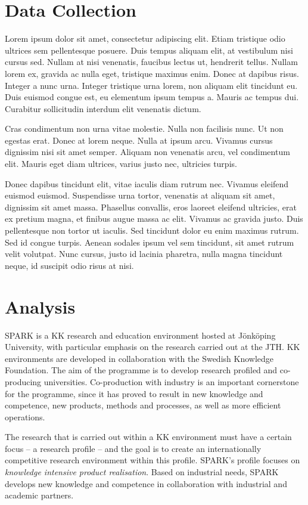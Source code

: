 \documentclass[11pt, a4paper]{resources/JTH}
\begin{document}
\section{Data Collection}

Lorem ipsum dolor sit amet, consectetur adipiscing elit. Etiam tristique odio ultrices sem pellentesque posuere. Duis tempus aliquam elit, at vestibulum nisi cursus sed. Nullam at nisi venenatis, faucibus lectus ut, hendrerit tellus. Nullam lorem ex, gravida ac nulla eget, tristique maximus enim. Donec at dapibus risus. Integer a nunc urna. Integer tristique urna lorem, non aliquam elit tincidunt eu. Duis euismod congue est, eu elementum ipsum tempus a. Mauris ac tempus dui. Curabitur sollicitudin interdum elit venenatis dictum.

Cras condimentum non urna vitae molestie. Nulla non facilisis nunc. Ut non egestas erat. Donec at lorem neque. Nulla at ipsum arcu. Vivamus cursus dignissim nisi sit amet semper. Aliquam non venenatis arcu, vel condimentum elit. Mauris eget diam ultrices, varius justo nec, ultricies turpis.

Donec dapibus tincidunt elit, vitae iaculis diam rutrum nec. Vivamus eleifend euismod euismod. Suspendisse urna tortor, venenatis at aliquam sit amet, dignissim sit amet massa. Phasellus convallis, eros laoreet eleifend ultricies, erat ex pretium magna, et finibus augue massa ac elit. Vivamus ac gravida justo. Duis pellentesque non tortor ut iaculis. Sed tincidunt dolor eu enim maximus rutrum. Sed id congue turpis. Aenean sodales ipsum vel sem tincidunt, sit amet rutrum velit volutpat. Nunc cursus, justo id lacinia pharetra, nulla magna tincidunt neque, id suscipit odio risus at nisi.

\section{Analysis}

SPARK is a KK research and education environment hosted at Jönköping University, with particular emphasis on the research carried out at the JTH. KK environments are developed in collaboration with the Swedish Knowledge Foundation. The aim of the programme is to develop research profiled and co-producing universities. Co-production with industry is an important cornerstone for the programme, since it has proved to result in new knowledge and competence, new products, methods and processes, as well as more efficient operations.

The research that is carried out within a KK environment must have a certain focus – a research profile – and the goal is to create an internationally competitive research environment within this profile. SPARK's profile focuses on \textit{knowledge intensive product realisation}. Based on industrial needs, SPARK develops new knowledge and competence in collaboration with industrial and academic partners.
\end{document}
